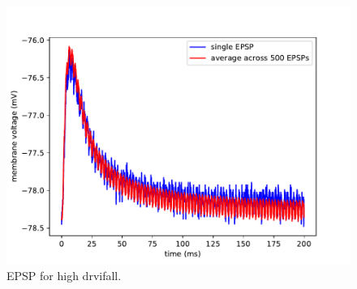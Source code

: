\documentclass[10pt,a4paper]{article}
\begin{document}
\begin{figure}[ht]
    \centering
    \includegraphics[width=\textwidth]{figures/epsp_fall_+.pdf}
    \caption{EPSP for high drvifall.}
    \label{fig:epsp_fall+}
\end{figure}
\end{document}
